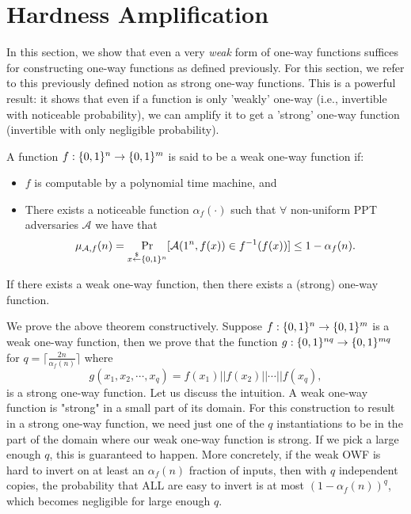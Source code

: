 \section{Hardness Amplification}
\label{sec:owf:amplify}
In this section, we show that even a very \emph{weak} form of one-way functions suffices for constructing one-way functions as defined previously. For this section, we refer to this previously defined notion as strong one-way functions. This is a powerful result: it shows that even if a function is only 'weakly' one-way (i.e., invertible with noticeable probability), we can amplify it to get a 'strong' one-way function (invertible with only negligible probability).
\begin{definition}
A function $f : \{0,1\}^{n} \rightarrow \{0,1\}^{m}$ is said to be a weak one-way function if:
\begin{itemize}
\item[-] $f$ is computable by a polynomial time machine, and
\item[-] There exists a noticeable function $\alpha_f(\cdot)$ such that $\forall$ non-uniform PPT adversaries $\mathcal{A}$ we have that
    $$
    \mu_{\mathcal{A},f}(n) =
    \Pr_{x \stackrel{\$}{\leftarrow} \{0,1\}^{n}}[ \mathcal{A}(1^n, f(x)) \in f^{-1}(f(x))] \leq 1 - \alpha_{f}(n).
    $$
\end{itemize}
\end{definition}

\begin{theorem}\label{theorem:weakstrongOWF}
If there exists a weak one-way function, then there exists a (strong) one-way function.
\end{theorem}

\proof We prove the above theorem constructively. Suppose $f : \{0,1\}^{n} \rightarrow \{0,1\}^{m}$ is a weak one-way function, then we prove that the function $g: \{0,1\}^{nq} \rightarrow \{0,1\}^{mq}$ for $q = \lceil \frac{2n}{\alpha_{f}(n)} \rceil$ where 
$$g(x_1, x_2, \cdots, x_q) = f(x_1) || f(x_2) || \cdots || f(x_q),$$
 is a strong one-way function. Let us discuss the intuition. A weak one-way function is "strong" in a small part of its domain. For this construction to result in a strong one-way function, we need just one of the $q$ instantiations to be in the part of the domain where our weak one-way function is strong. If we pick a large enough $q$, this is guaranteed to happen. More concretely, if the weak OWF is hard to invert on at least an $\alpha_f(n)$ fraction of inputs, then with $q$ independent copies, the probability that ALL are easy to invert is at most $(1-\alpha_f(n))^q$, which becomes negligible for large enough $q$.

